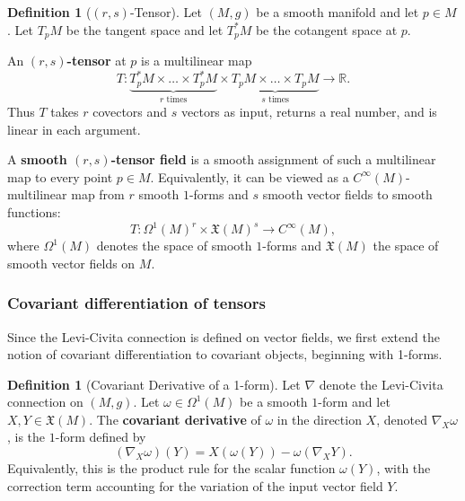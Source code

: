\documentclass[11pt]{article}
\theoremstyle{plain}
\theoremstyle{definition}
\newtheorem{definition}[theorem]{Definition}
\theoremstyle{remark}
\newcommand{\vspacesub}{\vspace{0pt}}
\begin{document}
\begin{definition}[$(r,s)$-Tensor]
\label{def:rs_tensor}
    Let $(M,g)$ be a smooth manifold and let $p\in M$.  Let $T_pM$ be
    the tangent space and let $T_p^*M$ be the cotangent space at $p$.

    An \textbf{$(r,s)$-tensor} at $p$ is a multilinear map
    \begin{equation}
        T: \underbrace{T_p^* M \times \dots \times T_p^* M}_{r \text{ times}} \times \underbrace{T_p M \times \dots \times T_p M}_{s \text{ times}} \to \mathbb{R}.
    \end{equation}
    Thus $T$ takes $r$ covectors and $s$ vectors as input, returns a real
    number, and is linear in each argument.

    A \textbf{smooth $(r,s)$-tensor field} is a smooth assignment of such a
    multilinear map to every point $p\in M$.  Equivalently, it can be viewed
    as a $C^\infty(M)$-multilinear map from $r$ smooth $1$-forms and $s$
    smooth vector fields to smooth functions:
    \begin{equation}
        T: \Omega^1(M)^r \times \mathfrak{X}(M)^s \to C^\infty(M),
    \end{equation}
where $\Omega^1(M)$ denotes the space of smooth $1$-forms and
$\mathfrak{X}(M)$ the space of smooth vector fields on $M$.
\end{definition}

\subsubsection{Covariant differentiation of tensors}

\vspacesub 

Since the Levi-Civita connection is defined on vector fields, we first extend
the notion of covariant differentiation to covariant objects, beginning with
1-forms.

\begin{definition}[Covariant Derivative of a 1-form]
\label{def:cov_dev_1form}
    Let $\nabla$ denote the Levi-Civita connection on $(M,g)$.  Let
    $\omega\in\Omega^1(M)$ be a smooth $1$-form and let
    $X,Y\in\mathfrak{X}(M)$.  The \textbf{covariant derivative} of
    $\omega$ in the direction $X$, denoted $\nabla_X\omega$, is the
    $1$-form defined by
    \begin{equation}
        (\nabla_X \omega)(Y) = X(\omega(Y)) - \omega(\nabla_X Y).
    \end{equation}
Equivalently, this is the product rule for the scalar function
$\omega(Y)$, with the correction term accounting for the variation of the
input vector field $Y$.
\end{definition}
\end{document}
